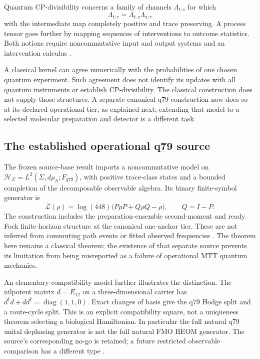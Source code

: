 \documentclass[11pt]{article}
\theoremstyle{definition}
\theoremstyle{remark}
\newcommand{\cH}{\mathcal{H}}
\begin{document}
Quantum CP-divisibility concerns a family of channels
\(\Lambda_{t:s}\) for which
\[
\Lambda_{t:r}=\Lambda_{t:s}\Lambda_{s:r}
\]
with the intermediate map completely positive and trace preserving.  A
process tensor goes further by mapping sequences of interventions to outcome
statistics.  Both notions require noncommutative input and output systems and
an intervention calculus \cite{pollock2018framework,pollock2018markov}.

A classical kernel can agree numerically with the probabilities of one chosen
quantum experiment.  Such agreement does not identify its updates with all
quantum instruments or establish CP-divisibility. The classical construction
does not supply those structures. A separate canonical q79 construction now
does so at its declared operational tier, as explained next; extending that
model to a selected molecular preparation and detector is a different task.

\subsection{The established operational q79 source}\label{sec:q79-source}

The frozen source-base result imports a noncommutative model on
\(\cH_\Sigma=L^2(\Sigma,d\mu_h;F_{q79})\), with positive trace-class states
and a bounded completion of the decomposable observable algebra. Its binary
finite-symbol generator is
\[
\overline{\mathcal L}(\rho)=\log(448)
 \bigl(P\rho P+Q\rho Q-\rho\bigr),\qquad Q=I-P.
\]
The construction includes the preparation-ensemble second-moment and ready
Fock finite-horizon structure at the canonical one-anchor tier. These are
not inferred from commuting path events or fitted observed frequencies
\cite{beq46}. The theorem here remains a classical theorem; the existence of
that separate source prevents its limitation from being misreported as a
failure of operational MTT quantum mechanics.

An elementary compatibility model further illustrates the distinction. The
nilpotent matrix \(d=E_{12}\) on a three-dimensional carrier has
\(d^\dagger d+dd^\dagger=\operatorname{diag}(1,1,0)\). Exact changes of basis
give the q79 Hodge split and a route-cycle split. This is an explicit
compatibility square, not a uniqueness theorem selecting a biological
Hamiltonian. In particular the full natural q79 unital dephasing generator
is not the full natural FMO HEOM generator. The source's corresponding
no-go is retained; a future restricted observable comparison has a different
type \cite{beq47}.
\end{document}

